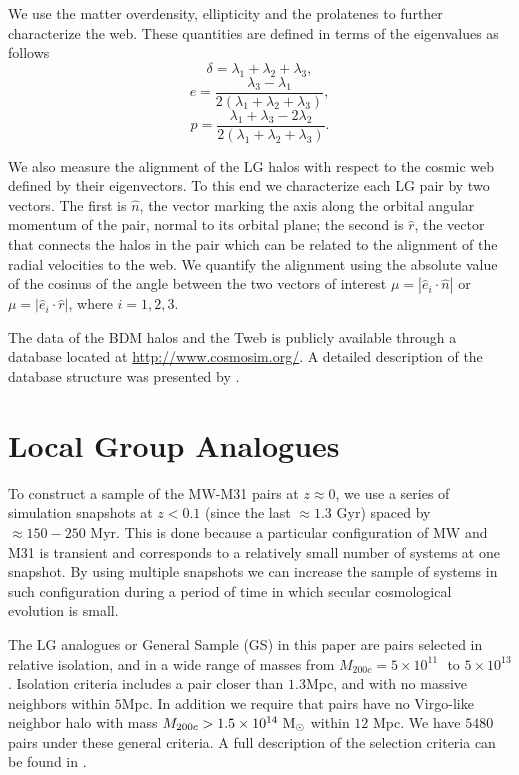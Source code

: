 \documentclass{emulateapj}
\newcommand{\mpc}{\rm{Mpc}}
\newcommand{\msun}{{\ifmmode{{\rm {M_{\odot}}}}\else{${\rm{M_{\odot}}}$}\fi}}
\begin{document}
We use the matter overdensity, ellipticity and the prolatenes to
further characterize the web. 
These quantities are defined in terms of the
eigenvalues as follows 
%
\begin{equation}
\delta = \lambda_1 + \lambda_2 + \lambda_3,
\end{equation}
%
\begin{equation}
e= \frac{\lambda_3 - \lambda_1}{2(\lambda_1 + \lambda_2 + \lambda_3)}, 
\end{equation}
%
\begin{equation}
p= \frac{\lambda_1 + \lambda_3 - 2\lambda_2}{2(\lambda_1 + \lambda_2 +
  \lambda_3)}.
\end{equation}

We also measure the alignment of the LG halos with respect to the
cosmic web defined by their eigenvectors.
To this end we characterize each LG pair by two vectors. 
The first is $\hat{n}$, the vector marking the axis along the orbital angular
momentum of the pair, normal to its orbital plane; the second is
$\hat{r}$, the vector that connects the halos in the pair which can be
related to the alignment of the radial velocities to the web.
We quantify the alignment using the absolute value of the cosinus of
the angle between the two vectors of interest $\mu=|\hat{e}_i \cdot
\hat{n}|$ or $\mu=|\hat{e}_i\cdot \hat{r}|$, where $i=1,2,3$. 


The data of the BDM halos and the Tweb is publicly available through
a database located at \url{http://www.cosmosim.org/}. A detailed
description of the database structure was presented by \cite{Riebe2013}.

\section{Local Group Analogues}
\label{sec:lg_analogues}

To construct a sample of the MW-M31 pairs at $z\approx 0$, we use a
series of simulation snapshots  at $z<0.1$ (since the last $\approx
1.3$ Gyr) spaced by $\approx 150-250$ Myr. 
This is done because a particular configuration of MW and M31 is transient and
corresponds to a relatively small number of systems at one
snapshot. 
By using multiple snapshots we can increase the sample of systems in
such configuration during a period of time in which secular
cosmological evolution is small.  

The LG analogues or General Sample (GS) in this paper are pairs selected in
relative isolation, and in a wide range of masses from  $M_{200c}=5
\times 10^{11}$ \msun $ $ to $ 5 \times 10^{13}$ \msun.  
Isolation criteria includes a pair closer than $1.3$\mpc, and with no
massive neighbors within $5$\mpc.
In addition we require that pairs have no Virgo-like neighbor halo
with mass $M_{200c}>1.5 \times 10^{14}\ \rm M_{\odot}$ within $12$
Mpc.  
We have $5480$ pairs under these general criteria. 
A full description of the selection criteria can be found in
\citet{lganalogues,sat}.   
\end{document}

